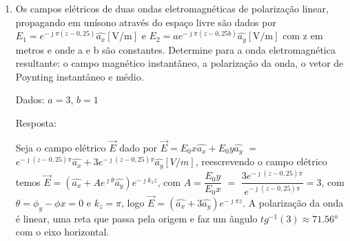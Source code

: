 \begin{enumerate}[1.]
\item Os campos elétricos de duas ondas eletromagnéticas de polarização linear, propagando em unísono através do espaço livre são dados por $E_{1} = e^{-\jmath \pi (z - 0,25)} \hat{a_{x}} [\si{\volt/\meter}]$ e $E_{2} = ae^{-\jmath \pi (z - 0,25b)} \hat{a_{y}} [\si{\volt/\meter}]$ com z em metros e onde a e b são constantes. Determine para a onda eletromagnética resultante: o campo magnético instantâneo, a polarização da onda, o vetor de Poynting instantâneo e médio.  
  

    Dados: $a = 3$, $b = 1$


    Resposta:

    Seja o campo elétrico $\vec{E}$ dado por $\vec{E} = E_{0}x \hat{a_{x}} + E_{0}y \hat{ a_{y}}$  $=$ $e^{-\jmath (z - 0,25) \pi} \hat{a_{x}} + 3 e^{-\jmath (z - 0,25)\pi} \hat{a_{y}} [V/m]$, reescrevendo o campo elétrico temos $\vec{E} = (\hat{a_{x}} + A e^{\jmath \theta} \hat{a_{y}})e^{-\jmath k_{z} z}$, com $A = \dfrac{E_{0}y}{E_{0}x}$ $=$ $\dfrac{3 e^{-\jmath (z - 0,25)\pi}}{e^{-\jmath (z - 0,25) \pi}} = 3$, com $\theta = \phi_{y} - \phi{x}  = 0$ e $k_{z} = \pi$, logo $\vec{E} = (\hat{a_{x}} + 3 \hat{a_{y}})e^{-\jmath \pi z}$. A polarização da onda é linear, uma reta que passa pela origem e faz um ângulo $tg^{-1}(3) \approx 71.56\si{\degree}$ com o eixo horizontal.

\end{enumerate}


